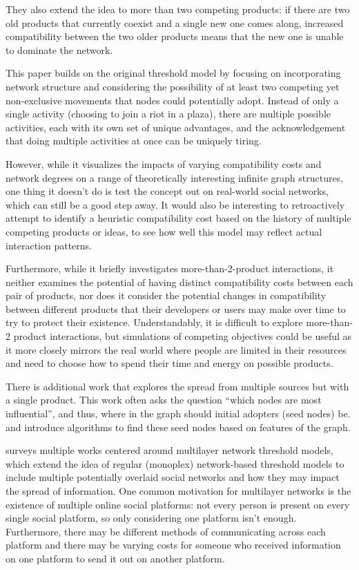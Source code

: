 They also extend the idea to more than two competing products: if there are two old products that currently coexist and a single new one comes along, increased compatibility between the two older products means that the new one is unable to dominate the network.

This paper builds on the original threshold model \cite{granovetter} by focusing on incorporating network structure and considering the possibility of at least two competing yet non-exclusive movements that nodes could potentially adopt. Instead of only a single activity (choosing to join a riot in a plaza), there are multiple possible activities, each with its own set of unique advantages, and the acknowledgement that doing multiple activities at once can be uniquely tiring.

However, while it visualizes the impacts of varying compatibility costs and network degrees on a range of theoretically interesting infinite graph structures, one thing it doesn't do is test the concept out on real-world social networks, which can still be a good step away. It would also be interesting to retroactively attempt to identify a heuristic compatibility cost based on the history of multiple competing products or ideas, to see how well this model may reflect actual interaction patterns.

Furthermore, while it briefly investigates more-than-2-product interactions, it neither examines the potential of having distinct compatibility costs between each pair of products, nor does it consider the potential changes in compatibility between different products that their developers or users may make over time to try to protect their existence. Understandably, it is difficult to explore more-than-2 product interactions, but simulations of competing objectives could be useful as it more closely mirrors the real world where people are limited in their resources and need to choose how to spend their time and energy on possible products. 

There is additional work that explores the spread from multiple sources but with a single product. This work often asks the question “which nodes are most influential”, and thus, where in the graph should initial adopters (seed nodes) be. \cite{kempe} and \cite{chenEfficient} introduce algorithms to find these seed nodes based on features of the graph.

\cite{salehi} surveys multiple works centered around multilayer network threshold models, which extend the idea of regular (monoplex) network-based threshold models to include multiple potentially overlaid social networks and how they may impact the spread of information. One common motivation for multilayer networks is the existence of multiple online social platforms: not every person is present on every single social platform, so only considering one platform isn't enough. Furthermore, there may be different methods of communicating across each platform and there may be varying costs for someone who received information on one platform to send it out on another platform.

